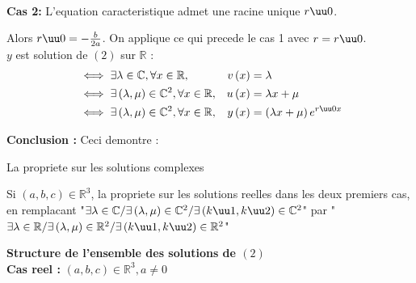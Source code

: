 \documentclass[12pt,twoside,a4paper]{article}
\begin{document}
\begin{preuve}
\begin{liste}
\begin{tab}
$$\begin{aligned}
							\end{aligned}$$
						\end{tab}
						\textbf{Cas 2:} L'equation caracteristique admet une racine unique $r\uu0$.
						\begin{tab}
							Alors $r\uu0=-\frac{b}{2a}$. On applique ce qui precede le cas 1 avec $r=r\uu0$. \\
							$y$ est solution de $\left(2\right)$ sur $\mathbb{R}$ :
							$$\begin{aligned}
								&\iff\exists\lambda\in\mathbb{C},\forall x\in\mathbb{R},&v\left(x\right)&=\lambda \\
								&\iff\exists\left(\lambda,\mu\right)\in\mathbb{C}^2,\forall x\in\mathbb{R},&u\left(x\right)&=\lambda x+\mu \\
								&\iff\exists\left(\lambda,\mu\right)\in\mathbb{C}^2,\forall x\in\mathbb{R},&y\left(x\right)&=\left(\lambda x+\mu\right)e^{r\uu0x}
							\end{aligned}$$
						\end{tab}
				\end{liste}
				\textbf{Conclusion :} Ceci demontre :
				\begin{liste}
					\item La propriete sur les solutions complexes
					\item Si $\left(a,b,c\right)\in\mathbb{R}^3$, la propriete sur les solutions reelles dans les deux premiers cas, en remplacant "$\exists\lambda\in\mathbb{C}/\exists\left(\lambda,\mu\right)\in\mathbb{C}^2/\exists\left(k\uu1,k\uu2\right)\in\mathbb{C}^2$" par "$\exists\lambda\in\mathbb{R}/\exists\left(\lambda,\mu\right)\in\mathbb{R}^2/\exists\left(k\uu1,k\uu2\right)\in\mathbb{R}^2$"
				\end{liste}
			\end{preuve}
			\textbf{Structure de l'ensemble des solutions de $\left(2\right)$} \\
			\textbf{Cas reel :} $\left(a,b,c\right)\in\mathbb{R}^3,a\neq0$
\end{document}
